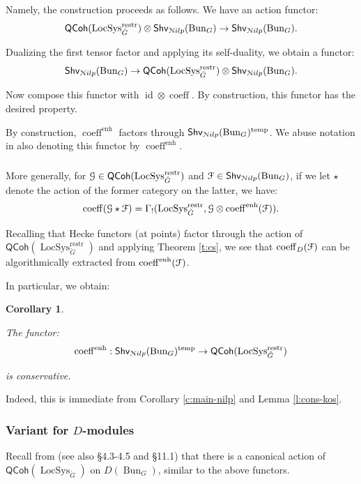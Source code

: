 \documentclass[reqno,11pt]{amsart}
\numberwithin{equation}{subsection}
\newtheorem{cor}[thm]{Corollary}
\theoremstyle{remark}
\newcommand{\sF}{{\EuScript F}}
\newcommand{\sG}{{\EuScript G}}
\newcommand{\sN}{{\EuScript N}}
\newcommand{\on}{\operatorname}
\newcommand{\id}{\on{id}}
\newcommand{\Bun}{\on{Bun}}
\newcommand{\LocSys}{\on{LocSys}}
\newcommand{\QCoh}{\mathsf{QCoh}}
\newcommand{\coeff}{\on{coeff}}
\newcommand{\enh}{\on{enh}}
\newcommand{\Shv}{\mathsf{Shv}}
\newcommand{\temp}{\on{temp}}
\newcommand{\Nilp}{\sN ilp}
\begin{document}
Namely, the construction proceeds as follows.
We have an action functor:
%
\[
\QCoh(\LocSys_{\check{G}}^{\on{restr}}) \otimes 
\Shv_{\Nilp}(\Bun_G) \to \Shv_{\Nilp}(\Bun_G).
\]

\noindent Dualizing the first tensor factor and applying its self-duality,
we obtain a functor:
%
\[
\Shv_{\Nilp}(\Bun_G) \to 
\QCoh(\LocSys_{\check{G}}^{\on{restr}}) \otimes \Shv_{\Nilp}(\Bun_G).
\]

\noindent Now compose this functor with $\id \otimes \coeff$.
By construction, this functor has the desired property.

By construction, $\coeff^{\enh}$ factors through $\Shv_{\Nilp}(\Bun_G)^{\temp}$.
We abuse notation in also denoting this functor by $\coeff^{\enh}$.

\subsubsection{}\label{sss:coeffd-coeffenh}

More generally, for $\sG \in \QCoh(\LocSys_{\check{G}}^{\on{restr}})$
and $\sF \in \Shv_{\Nilp}(\Bun_G)$, if we let $\star$ denote the
action of the former category on the latter, we have:
%
\[
\coeff(\sG \star \sF) = 
\Gamma_!(\LocSys_{\check{G}}^{\on{restr}},\sG \otimes \coeff^{\enh}(\sF)).
\]

Recalling that Hecke functors (at points) factor through the
action of $\QCoh(\LocSys_{\check{G}}^{\on{restr}})$ and applying
Theorem \ref{t:cs}, we see that $\coeff_D(\sF)$
can be algorithmically extracted from $\coeff^{\enh}(\sF)$.

In particular, we obtain:

\begin{cor}\label{c:coeff-enh-nilp}

The functor:
%
\[
\coeff^{\enh}:\Shv_{\Nilp}(\Bun_G)^{\temp} \to \QCoh(\LocSys_{\check{G}}^{\on{restr}})
\]

\noindent is conservative.

\end{cor}

Indeed, this is immediate from Corollary \ref{c:main-nilp} and Lemma \ref{l:cons-kos}.


\subsubsection{Variant for $D$-modules}

Recall from \cite{generalized-vanishing} (see also \cite{dennis-laumonconf} 
\S 4.3-4.5 and \S 11.1) that there
is a canonical action of $\QCoh(\LocSys_{\check{G}})$ on $D(\Bun_G)$,
similar to the above functors.
\end{document}
